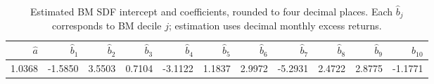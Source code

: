 \begin{table}[htbp]
  \centering
  \caption{Estimated BM SDF intercept and coefficients, rounded to four
  decimal places. Each $\hat b_j$ corresponds to BM decile $j$;
  estimation uses decimal monthly excess returns.}
  \label{tab:q2a-bm-sdf-parameters}
  \small
  \setlength{\tabcolsep}{3pt}
  \begin{tabular}{*{11}{r}}
    \toprule
    $\hat a$ & $\hat b_{1}$ & $\hat b_{2}$ & $\hat b_{3}$ & $\hat b_{4}$ & $\hat b_{5}$ & $\hat b_{6}$ & $\hat b_{7}$ & $\hat b_{8}$ & $\hat b_{9}$ & $\hat b_{10}$ \\
    \midrule
    1.0368 & -1.5850 & 3.5503 & 0.7104 & -3.1122 & 1.1837 & 2.9972 & -5.2931 & 2.4722 & 2.8775 & -1.1771 \\
    \bottomrule
  \end{tabular}
\end{table}
